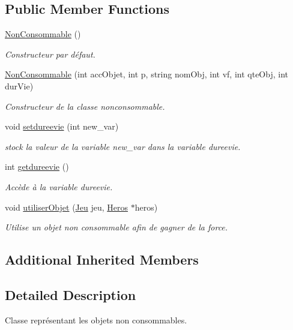 \subsection*{Public Member Functions}
\begin{DoxyCompactItemize}
\item 
\hyperlink{class_non_consommable_ab2dcf94cbb47401e632a37b594ae8091}{Non\-Consommable} ()
\begin{DoxyCompactList}\small\item\em Constructeur par défaut. \end{DoxyCompactList}\item 
\hyperlink{class_non_consommable_a7c0078a9defcc714a9d6e54b97e57203}{Non\-Consommable} (int acc\-Objet, int p, string nom\-Obj, int vf, int qte\-Obj, int dur\-Vie)
\begin{DoxyCompactList}\small\item\em Constructeur de la classe nonconsommable. \end{DoxyCompactList}\item 
void \hyperlink{class_non_consommable_acf08bda31a32e15598a71bb28546629d}{setdureevie} (int new\-\_\-var)
\begin{DoxyCompactList}\small\item\em stock la valeur de la variable new\-\_\-var dans la variable dureevie. \end{DoxyCompactList}\item 
int \hyperlink{class_non_consommable_a58c576024c1daba5b28e4c243ded1c18}{getdureevie} ()
\begin{DoxyCompactList}\small\item\em Accède à la variable dureevie. \end{DoxyCompactList}\item 
void \hyperlink{class_non_consommable_acfb7cfd4a6669eaf4acb1422545ef857}{utiliser\-Objet} (\hyperlink{class_jeu}{Jeu} jeu, \hyperlink{class_heros}{Heros} $\ast$heros)
\begin{DoxyCompactList}\small\item\em Utilise un objet non consommable afin de gagner de la force. \end{DoxyCompactList}\end{DoxyCompactItemize}
\subsection*{Additional Inherited Members}


\subsection{Detailed Description}
Classe représentant les objets non consommables. 

